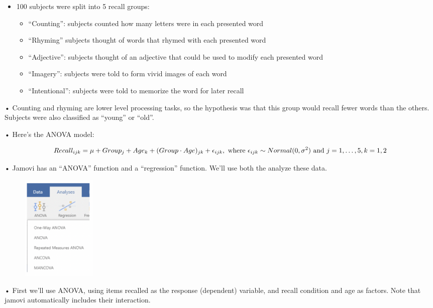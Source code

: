 \documentclass[
  letterpaper,
  DIV=11,
  numbers=noendperiod]{scrreprt}
\begin{document}
\begin{itemize}
\item
  100 subjects were split into 5 recall groups:

  \begin{itemize}
  \item
    ``Counting'': subjects counted how many letters were in each
    presented word
  \item
    ``Rhyming'' subjects thought of words that rhymed with each
    presented word
  \item
    ``Adjective'': subjects thought of an adjective that could be used
    to modify each presented word
  \item
    ``Imagery'': subjects were told to form vivid images of each word
  \item
    ``Intentional'': subjects were told to memorize the word for later
    recall
  \end{itemize}
\end{itemize}

• Counting and rhyming are lower level processing tasks, so the
hypothesis was that this group would recall fewer words than the others.
Subjects were also classified as ``young'' or ``old''.

• Here's the ANOVA model:

\[
Recall_{ijk} = \mu + Group_j + Age_k + (Group \cdot Age)_{jk} + \epsilon_{ijk}, \text{ where } \epsilon_{ijk} \sim Normal(0,\sigma^2) \\
\text{ and } j = 1, \dots ,5, k = 1, 2
\]

• Jamovi has an ``ANOVA'' function and a ``regression'' function. We'll
use both the analyze these data.

\begin{figure}

\includegraphics[width=1.41667in,height=\textheight]{images/mod5_1.png} \hfill{}

\end{figure}

• First we'll use ANOVA, using items recalled as the response
(dependent) variable, and recall condition and age as factors. Note that
jamovi automatically includes their interaction.
\end{document}

